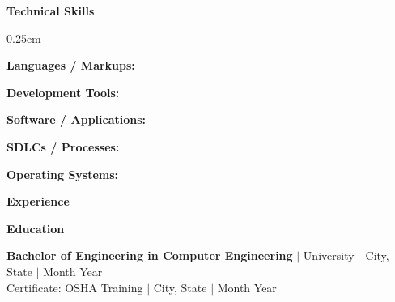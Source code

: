 \documentclass[12pt]{article}
\newcommand{\sectionheader}[1]{
    \bigbreak
    \noindent
    \large
    \textbf{#1} \\
    \footnotesize
}
\begin{document}
\sectionheader{Technical Skills}

\begin{noitemize}
    \itemsep0.25em
    \item \textbf{Languages / Markups:} \languages
    \item \textbf{Development Tools:} \developmenttools
    \item \textbf{Software / Applications:} \softwareapplications
    \item \textbf{SDLCs / Processes:} \softwaredevelopmentlifecycles
    \item \textbf{Operating Systems:} \operatingsystems
\end{noitemize}



\newcommand{\squeezeup}{\vspace{-4mm}}

\sectionheader{Experience}
\squeezeup



%



\newcommand{\eductionitem}[4]{#1 \(|\) #2 \(|\) #3}

\newcommand{\education}
{\eductionitem{\textbf{Bachelor of Engineering in Computer Engineering}}{University - City, State}{Month Year}{}
\\
\eductionitem{Certificate: OSHA Training}{City, State}{Month Year}{}
}

\sectionheader{Education}

\noindent
\education




\end{document}
